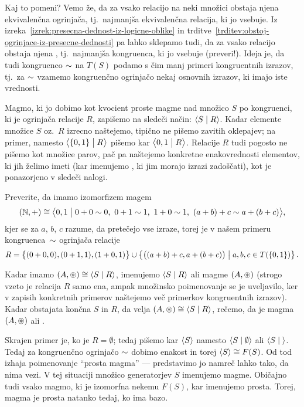 Kaj to pomeni? Vemo že, da za vsako relacijo na neki množici obstaja njena ekvivalenčna ogrinjača, tj.~najmanjša ekvivalenčna relacija, ki jo vsebuje. Iz izreka~\ref{izrek:presecna-dednost-iz-logicne-oblike} in trditve~\ref{trditev:obstoj-ogrinjace-iz-presecne-dednosti} pa lahko sklepamo tudi, da za vsako relacijo obstaja njena , tj.~najmanjša kongruenca, ki jo vsebuje (preveri!). Ideja je, da tudi kongruenco $\sim$ na $T(S)$ podamo s čim manj primeri kongruentnih izrazov, tj.~za $\sim$ vzamemo kongruenčno ogrinjačo nekaj osnovnih izrazov, ki imajo iste vrednosti.

Magmo, ki jo dobimo kot kvocient proste magme nad množico $S$ po kongruenci, ki je ogrinjača relacije $R$, zapišemo na sledeči način: $\pres{S}{R}$. Kadar elemente množice $S$ oz.~$R$ izrecno naštejemo, tipično ne pišemo zavitih oklepajev; na primer, namesto $\pres[1]{\set{0, 1}}{R}$ pišemo kar $\pres[1]{0, 1}{R}$. Relacije $R$ tudi pogosto ne pišemo kot množice parov, pač pa naštejemo konkretne enakovrednosti elementov, ki jih želimo imeti (kar imenujemo , ki jim morajo izrazi zadoščati), kot je ponazorjeno v sledeči nalogi.

\begin{naloga}
Preverite, da imamo izomorfizem magem
\[(\NN, +) \ism \pres[1]{0, 1}{0 + 0 \equ 0,\ 0 + 1 \equ 1,\ 1 + 0 \equ 1,\ (a + b) + c \equ a + (b + c)},\]
kjer se za $a$, $b$, $c$ razume, da pretečejo vse izraze, torej je v našem primeru kongruenca~$\sim$ ogrinjača relacije
\[R = \set[1]{(0 + 0, 0), (0 + 1, 1), (1 + 0, 1)} \cup \set{\big((a + b) + c, a + (b + c)\big)}{a, b, c \in T(\set{0, 1})}.\]
\end{naloga}

Kadar imamo $(A, \oper) \ism \pres{S}{R}$, imenujemo $\pres{S}{R}$  ali  magme $(A, \mathop{\circledast}\nolimits)$  (strogo vzeto je relacija $R$ samo ena, ampak množinsko poimenovanje se je uveljavilo, ker v zapisih konkretnih primerov naštejemo več primerkov kongruentnih izrazov). Kadar obstajata končna $S$ in $R$, da velja $(A, \oper) \ism \pres{S}{R}$, rečemo, da je magma $(A, \mathop{\circledast}\nolimits)$  ali .

Skrajen primer je, ko je $R = \emptyset$; tedaj pišemo kar $\pres{S}$ namesto $\pres{S}{\emptyset}$ ali $\pres{S}{ }$. Tedaj za kongruenčno ogrinjačo $\sim$ dobimo enakost in torej $\pres{S} \ism F(S)$. Od tod izhaja poimenovanje ``prosta magma'' --- predstavimo jo namreč lahko tako, da nima vezi. V tej situaciji množico generatorjev $S$ imenujemo  magme. Običajno tudi vsako magmo, ki je izomorfna nekemu $F(S)$, kar imenujemo prosta. Torej, magma je prosta natanko tedaj, ko ima bazo.

